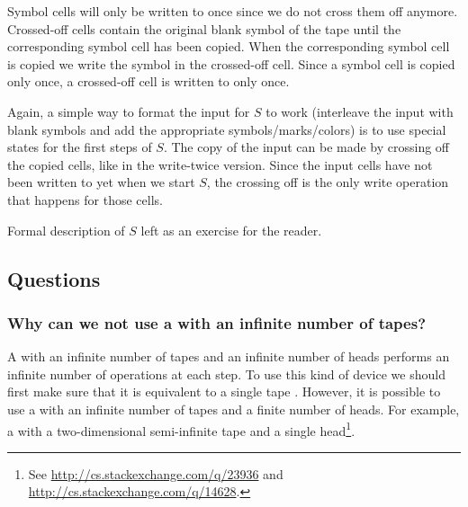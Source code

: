 Symbol cells will only be written to once since we do not cross them off
anymore. Crossed-off cells contain the original blank symbol of the tape until
the corresponding symbol cell has been copied. When the corresponding symbol
cell is copied we write the \X{} symbol in the crossed-off cell. Since a symbol
cell is copied only once, a crossed-off cell is written to only once.

Again, a simple way to format the input for \(S\) to work
(interleave the input with blank symbols and add the
appropriate symbols/marks/colors) is to use special states for the
first steps of \(S\). The copy of the input can be made by crossing off the copied
cells, like in the write-twice version. Since the input cells have not been
written to yet when we start \(S\), the crossing off is the only write
operation that happens for those cells.

Formal description of $S$ left as an exercise for the reader.

\subsection{Questions}
\subsubsection{Why can we not use a \TM{} with an infinite number of
tapes?}
A \TM{} with an infinite number of tapes and an infinite number of heads
performs an infinite number of operations at each step.
To use this kind of device we should first make sure that it is equivalent to a single
tape \TM{}.
However, it is possible to use a \TM{} with an infinite number of tapes
and a finite number of heads. For example, a \TM{} with a two-dimensional
semi-infinite tape and a single head\footnote{See
\url{http://cs.stackexchange.com/q/23936}
and
\url{http://cs.stackexchange.com/q/14628}.}.
